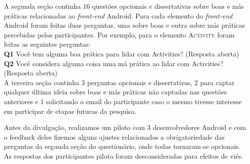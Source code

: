 A segunda seção continha 16 questões opcionais e dissertativas sobre boas e más práticas relacionadas ao \textit{front-end} Android. Para cada elemento do \textit{front-end} Android foram feitas duas perguntas, uma sobre boas e outra sobre más práticas percebidas pelos participantes. Por exemplo, para o elemento \textsc{Activity} foram feitas as seguintes perguntas: \\

\noindent
\textbf{Q1} Você tem alguma boa prática para lidar com Activities? (Resposta aberta) \\

\noindent
\textbf{Q2} Você considera alguma coisa uma má prática ao lidar com Activities? (Resposta aberta) \\

A terceira seção continha 3 perguntas opcionais e dissertativas, 2 para captar qualquer última ideia sobre boas e más práticas não captadas nas questões anteriores e 1 solicitando o email do participante caso o mesmo tivesse interesse em participar de etapas futuras da pesquisa. 

Antes da divulgação, realizamos um piloto com 3 desenvolvedores Android e com o feedback deles fizemos alguns ajustes relacionados a obrigatoriedade das perguntas da segunda seção do questionário, onde todas tornaram-se opcionais. As respostas dos participantes piloto foram desconsideradas para efeitos de viés. 


